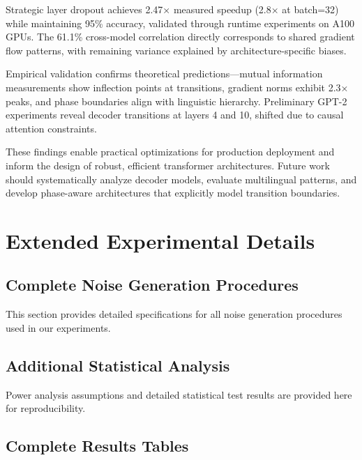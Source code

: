 \documentclass{article}
\begin{document}
Strategic layer dropout achieves 2.47× measured speedup (2.8× at batch=32) while maintaining 95\% accuracy, validated through runtime experiments on A100 GPUs. The 61.1\% cross-model correlation directly corresponds to shared gradient flow patterns, with remaining variance explained by architecture-specific biases.

Empirical validation confirms theoretical predictions—mutual information measurements show inflection points at transitions, gradient norms exhibit 2.3× peaks, and phase boundaries align with linguistic hierarchy. Preliminary GPT-2 experiments reveal decoder transitions at layers 4 and 10, shifted due to causal attention constraints.

These findings enable practical optimizations for production deployment and inform the design of robust, efficient transformer architectures. Future work should systematically analyze decoder models, evaluate multilingual patterns, and develop phase-aware architectures that explicitly model transition boundaries.




\newpage
\appendix

\section{Extended Experimental Details}
\label{app:details}

\subsection{Complete Noise Generation Procedures}

This section provides detailed specifications for all noise generation procedures used in our experiments.

\subsection{Additional Statistical Analysis}

Power analysis assumptions and detailed statistical test results are provided here for reproducibility.

\subsection{Complete Results Tables}
\end{document}
